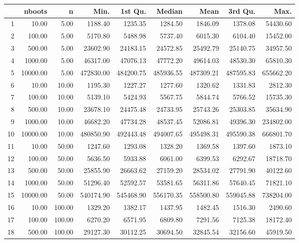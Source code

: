 \begin{table}[ht]
\centering
\begin{tabular}{rrrrrrrrr}
  \hline
 & nboots & n & Min. & 1st Qu. & Median & Mean & 3rd Qu. & Max. \\ 
  \hline
1 & 10.00 & 5.00 & 1188.40 & 1235.35 & 1284.50 & 1846.09 & 1378.08 & 54430.60 \\ 
  2 & 100.00 & 5.00 & 5170.80 & 5488.98 & 5737.40 & 6015.30 & 6104.40 & 15452.00 \\ 
  3 & 500.00 & 5.00 & 23602.90 & 24183.15 & 24572.85 & 25492.79 & 25140.75 & 34957.50 \\ 
  4 & 1000.00 & 5.00 & 46317.00 & 47076.13 & 47772.20 & 49614.03 & 48530.30 & 65810.30 \\ 
  5 & 10000.00 & 5.00 & 472830.00 & 484200.75 & 485936.55 & 487309.21 & 487595.83 & 655662.20 \\ 
  6 & 10.00 & 10.00 & 1195.30 & 1227.27 & 1277.60 & 1320.62 & 1331.83 & 2812.30 \\ 
  7 & 100.00 & 10.00 & 5139.10 & 5424.93 & 5567.75 & 5844.74 & 5766.52 & 15735.30 \\ 
  8 & 500.00 & 10.00 & 23678.10 & 24475.48 & 24733.95 & 25743.26 & 25303.85 & 35634.90 \\ 
  9 & 1000.00 & 10.00 & 46682.20 & 47734.28 & 48537.45 & 52086.81 & 49396.30 & 234802.00 \\ 
  10 & 10000.00 & 10.00 & 480850.90 & 492443.48 & 494007.65 & 495498.31 & 495590.38 & 666801.70 \\ 
  11 & 10.00 & 50.00 & 1247.60 & 1293.08 & 1328.20 & 1369.58 & 1397.60 & 1873.10 \\ 
  12 & 100.00 & 50.00 & 5636.50 & 5933.88 & 6061.00 & 6399.53 & 6292.67 & 18718.70 \\ 
  13 & 500.00 & 50.00 & 25855.90 & 26663.62 & 27159.20 & 28534.02 & 27791.90 & 40122.60 \\ 
  14 & 1000.00 & 50.00 & 51296.40 & 52592.57 & 53581.65 & 56311.86 & 57640.45 & 71821.10 \\ 
  15 & 10000.00 & 50.00 & 540174.90 & 545468.90 & 556170.35 & 558500.80 & 559045.88 & 738204.00 \\ 
  16 & 10.00 & 100.00 & 1329.20 & 1382.17 & 1437.95 & 1482.45 & 1516.30 & 2490.60 \\ 
  17 & 100.00 & 100.00 & 6270.20 & 6571.95 & 6809.80 & 7291.56 & 7125.38 & 18172.40 \\ 
  18 & 500.00 & 100.00 & 29127.30 & 30112.25 & 30694.50 & 32845.54 & 32156.60 & 45919.50 \\ 

\end{tabular}
\end{table}
